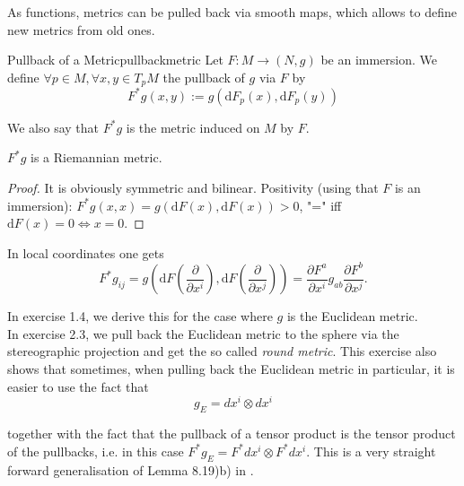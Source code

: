 


As functions, metrics can be pulled back via smooth maps, which allows to define new metrics from old ones.

\begin{colordef}{Pullback of a Metric}{pullbackmetric}
Let \(F: M \to (N, g)\) be an immersion. We define $\forall p \in M, \forall x, y \in T_pM$ the pullback of \(g\) via \(F\) by
\[
F^*g(x, y) := g(\mathrm{d}F_p(x), \mathrm{d}F_p(y))
\]
\end{colordef}

We also say that \(F^*g\) is the metric induced on \(M\) by \(F\).

\begin{colorlem}{}{}
\(F^*g\) is a Riemannian metric.
\end{colorlem}

\begin{proof}
It is obviously symmetric and bilinear. Positivity (using that $F$ is an immersion): \(F^*g(x, x) = g(\mathrm{d}F(x), \mathrm{d}F(x)) > 0\), "=" iff \(\mathrm{d}F(x) = 0 \iff x = 0\).
\end{proof}


In local coordinates one gets
\[
F^*g_{ij} = g\left(\mathrm{d}F\left(\frac{\partial}{\partial x^i}\right), \mathrm{d}F\left(\frac{\partial}{\partial x^j}\right)\right) = \frac{\partial F^a}{\partial x^i} g_{ab} \frac{\partial F^b}{\partial x^j}.
\]

In exercise 1.4, we derive this for the case where $g$ is the Euclidean metric.\\

In exercise 2.3, we pull back the Euclidean metric to the sphere via the stereographic projection and get the so called \emph{round metric}. This exercise also shows that sometimes, when pulling back the Euclidean metric in particular, it is easier to use the fact that
$$g_E = dx^i \otimes dx^i$$

together with the fact that the pullback of a tensor product is the tensor product of the pullbacks, i.e. in this case $F^*g_E = F^*dx^i \otimes F^*dx^i$. This is a very straight forward generalisation of Lemma 8.19)b) in \cite{tsakanikas2024dg2}.\\


